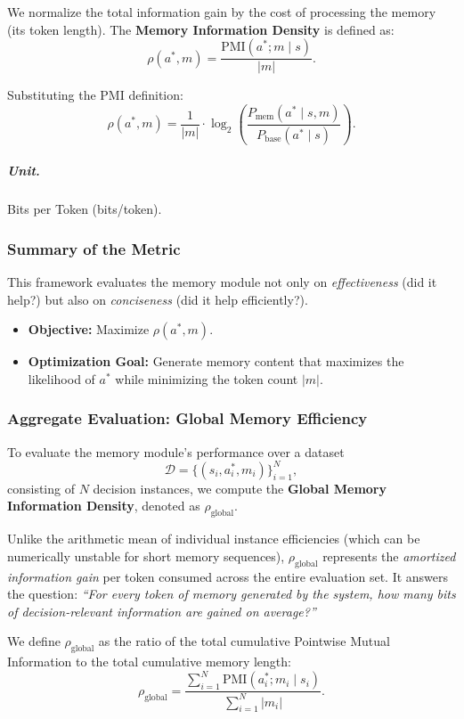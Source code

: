 We normalize the total information gain by the cost of processing the memory (its token length). The \textbf{Memory Information Density} is defined as:
\[
\rho(a^*, m) = \frac{\mathrm{PMI}(a^*; m \mid s)}{|m|}.
\]

Substituting the PMI definition:
\[
\rho(a^*, m)
    = \frac{1}{|m|} \cdot \log_{2} \left(
        \frac{P_{\text{mem}}(a^* \mid s, m)}{P_{\text{base}}(a^* \mid s)}
    \right).
\]

\subparagraph{Unit.} Bits per Token (bits/token).

\subsubsection{Summary of the Metric}

This framework evaluates the memory module not only on \emph{effectiveness} (did it help?) but also on \emph{conciseness} (did it help efficiently?).

\begin{itemize}
    \item \textbf{Objective:} Maximize $\rho(a^*, m)$.
    \item \textbf{Optimization Goal:} Generate memory content that maximizes the likelihood of $a^*$ while minimizing the token count $|m|$.
\end{itemize}

\subsubsection{Aggregate Evaluation: Global Memory Efficiency}

To evaluate the memory module's performance over a dataset 
\[
\mathcal{D} = \{(s_i, a^*_i, m_i)\}_{i=1}^{N},
\]
consisting of $N$ decision instances, we compute the \textbf{Global Memory Information Density}, denoted as $\rho_{\text{global}}$.

Unlike the arithmetic mean of individual instance efficiencies (which can be numerically unstable for short memory sequences), $\rho_{\text{global}}$ represents the \emph{amortized information gain} per token consumed across the entire evaluation set. It answers the question: \textit{``For every token of memory generated by the system, how many bits of decision-relevant information are gained on average?''}

We define $\rho_{\text{global}}$ as the ratio of the total cumulative Pointwise Mutual Information to the total cumulative memory length:
\[
\rho_{\text{global}} = 
\frac{
    \sum_{i=1}^{N} \mathrm{PMI}(a^*_i; m_i \mid s_i)
}{
    \sum_{i=1}^{N} |m_i|
}.
\]


